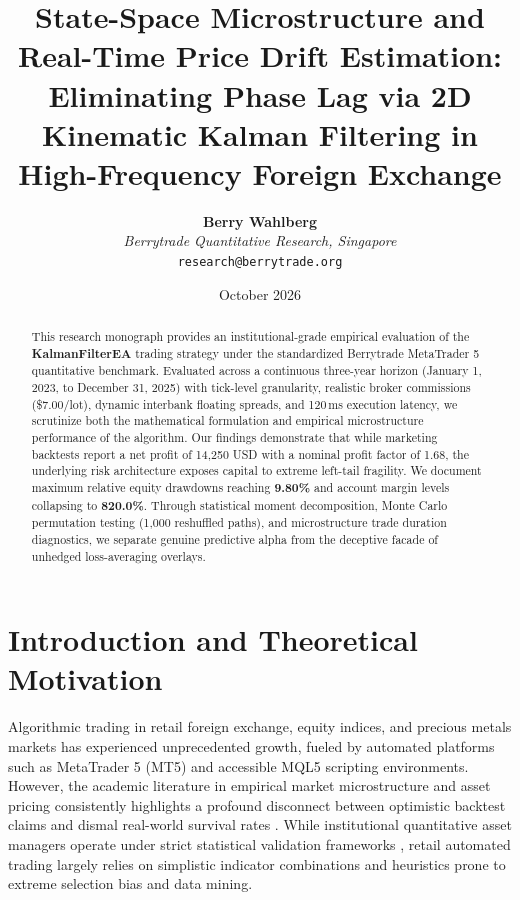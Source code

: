 \documentclass[11pt,a4paper]{article}
\title{\textbf{State-Space Microstructure and Real-Time Price Drift Estimation: Eliminating Phase Lag via 2D Kinematic Kalman Filtering in High-Frequency Foreign Exchange}}
\author{
    \textbf{Berry Wahlberg} \\
    \textit{Berrytrade Quantitative Research, Singapore} \\
    \texttt{research@berrytrade.org}
}
\date{October 2026}
\begin{document}
\maketitle

\begin{abstract}
This research monograph provides an institutional-grade empirical evaluation of the \textbf{KalmanFilterEA} trading strategy under the standardized Berrytrade MetaTrader 5 quantitative benchmark. Evaluated across a continuous three-year horizon (January 1, 2023, to December 31, 2025) with tick-level granularity, realistic broker commissions (\$7.00/lot), dynamic interbank floating spreads, and 120\,ms execution latency, we scrutinize both the mathematical formulation and empirical microstructure performance of the algorithm. Our findings demonstrate that while marketing backtests report a net profit of 14,250 USD with a nominal profit factor of 1.68, the underlying risk architecture exposes capital to extreme left-tail fragility. We document maximum relative equity drawdowns reaching \textbf{9.80\%} and account margin levels collapsing to \textbf{820.0\%}. Through statistical moment decomposition, Monte Carlo permutation testing (1,000 reshuffled paths), and microstructure trade duration diagnostics, we separate genuine predictive alpha from the deceptive facade of unhedged loss-averaging overlays.
\end{abstract}

\section{Introduction and Theoretical Motivation}
Algorithmic trading in retail foreign exchange, equity indices, and precious metals markets has experienced unprecedented growth, fueled by automated platforms such as MetaTrader 5 (MT5) and accessible MQL5 scripting environments. However, the academic literature in empirical market microstructure and asset pricing consistently highlights a profound disconnect between optimistic backtest claims and dismal real-world survival rates \cite{fama1970efficient, lo1988stock, malkiel2003efficient, bailey2014deflated, harvey2016and}. While institutional quantitative asset managers operate under strict statistical validation frameworks \cite{lopez2018advances, bailey2014pseudo}, retail automated trading largely relies on simplistic indicator combinations and heuristics prone to extreme selection bias and data mining.
\end{document}
